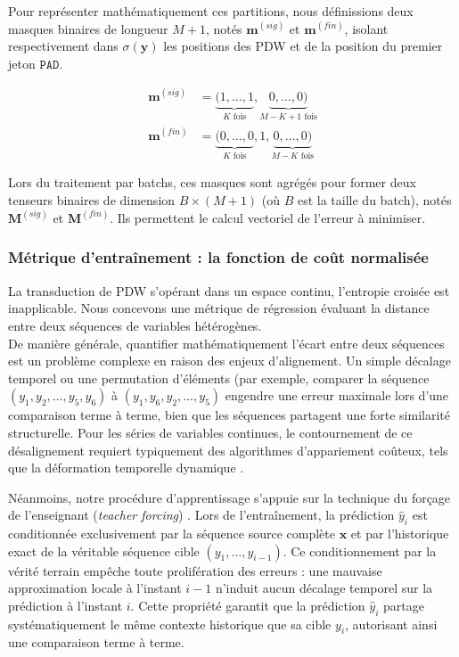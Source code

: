 Pour représenter mathématiquement ces partitions, nous définissions deux masques binaires de longueur $M+1$, notés $\mathbf{m}^{(sig)}$ et $\mathbf{m}^{(fin)}$, isolant respectivement dans $\sigma(\mathbf{y})$ les positions des PDW et de la position du premier jeton $\texttt{PAD}$.

\begin{align*}
\mathbf{m}^{(sig)} & = \underbrace{(1, \dots, 1}_{K \text{ fois}}, \underbrace{0, \dots, 0)}_{M-K+1 \text{ fois}}\\
\mathbf{m}^{(fin)} & = \underbrace{(0, \dots, 0}_{K \text{ fois}}, 1, \underbrace{0, \dots, 0)}_{M-K \text{ fois}}
\end{align*}

Lors du traitement par batchs, ces masques sont agrégés pour former deux tenseurs binaires de dimension $B \times (M+1)$ (où $B$ est la taille du batch), notés $\mathbf{M}^{(sig)}$ et $\mathbf{M}^{(fin)}$. Ils permettent le calcul vectoriel de l'erreur à minimiser.

\subsubsection{Métrique d'entraînement : la fonction de coût normalisée}
\label{seq:metseq2seq}
La transduction de PDW s'opérant dans un espace continu, l'entropie croisée est inapplicable. Nous concevons une métrique de régression évaluant la distance entre deux séquences de variables hétérogènes. \\

De manière générale, quantifier mathématiquement l'écart entre deux séquences est un problème complexe en raison des enjeux d'alignement. Un simple décalage temporel ou une permutation d'éléments (par exemple, comparer la séquence $(y_1, y_2, \dots, y_5, y_6)$ à $(y_1, y_6, y_2, \dots, y_5)$ engendre une erreur maximale lors d'une comparaison terme à terme, bien que les séquences partagent une forte similarité structurelle. Pour les séries de variables continues, le contournement de ce désalignement requiert typiquement des algorithmes d'appariement coûteux, tels que la déformation temporelle dynamique \cite{berndt_using_1994}.

Néanmoins, notre procédure d'apprentissage s'appuie sur la technique du forçage de l'enseignant (\textit{teacher forcing}) \cite{williams_learning_1989}. Lors de l'entraînement, la prédiction $\hat{y}_i$ est conditionnée exclusivement par la séquence source complète $\mathbf{x}$ et par l'historique exact de la véritable séquence cible $(y_1, \dots, y_{i-1})$. Ce conditionnement par la vérité terrain empêche toute prolifération des erreurs : une mauvaise approximation locale à l'instant $i-1$ n'induit aucun décalage temporel sur la prédiction à l'instant $i$. Cette propriété garantit que la prédiction $\hat{y}_i$ partage systématiquement le même contexte historique que sa cible $y_i$, autorisant ainsi une comparaison terme à terme.\\

